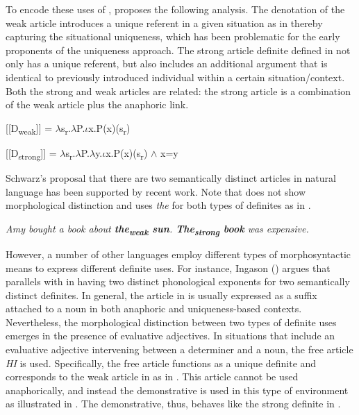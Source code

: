 \documentclass[output=paper,
modfonts
]{langscibook}
\begin{document}
To encode these uses of , \citet{Schwarz2009,Schwarz2013} proposes the following analysis. The denotation of the weak article introduces a unique referent in a given situation as in  thereby capturing the situational uniqueness, which has been problematic for the early proponents of the uniqueness approach. The strong article definite defined in  not only has a unique referent, but also includes an additional argument that is identical to previously introduced individual within a certain situation/context. Both the strong and weak articles are related: the strong article is a combination of the weak article plus the anaphoric link. 


\begin{exe} 
\ex \label{ex:sereikaite:18}
 {} [[D\textsubscript{weak}]] = $\lambda$s\textsubscript{r}.$\lambda$P.$\iota$x.P(x)(s\textsubscript{r})  \citep[264]{Schwarz2009}
\end{exe} 

\begin{exe} 
\ex \label{ex:sereikaite:19}
{} [[D\textsubscript{strong}]] = $\lambda$s\textsubscript{r}.$\lambda$P.$\lambda$y.$\iota$x.P(x)(s\textsubscript{r}) $\land$ x=y \citep[260]{Schwarz2009}
\end{exe} 

Schwarz's proposal that there are two semantically distinct articles in natural language has been supported by recent work. Note that  does not show morphological distinction and uses \textit{the} for both types of definites as in .

\begin{exe}
\ex \label{ex:sereikaite:20}
\textit{Amy bought a book about \textbf{the\textsubscript{weak} sun}. \textbf{The\textsubscript{strong} book} was expensive.} \citep[115]{Ingason2016}
\end{exe}

However, a number of other languages employ different types of morphosyntactic means to express different definite uses. For instance, Ingason (\citeyear{Ingason2016}) argues that  parallels with  in having two distinct phonological exponents for two semantically distinct definites. In general, the article in  is usually expressed as a suffix attached to a noun in both anaphoric and uniqueness-based contexts. Nevertheless, the morphological distinction between two types of definite uses emerges in the presence of evaluative adjectives. In situations that include an evaluative adjective intervening between a determiner and a noun, the free article 
\textit{HI} is used. Specifically, the free article functions as a unique definite and corresponds to the weak article in  as in . This article cannot be used anaphorically, and instead the demonstrative is used in this type of environment as illustrated in . The demonstrative, thus, behaves like the strong definite in .  
\end{document}
